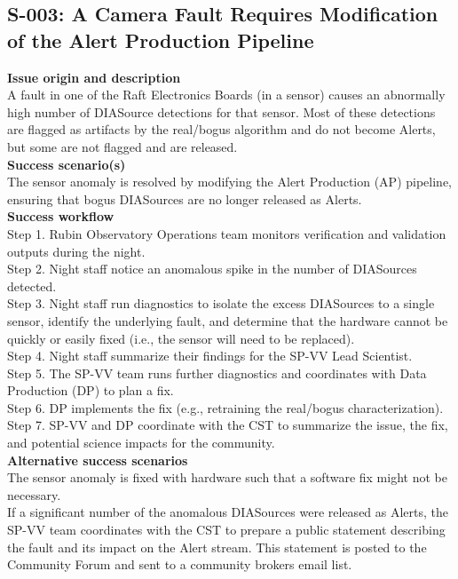 \subsection{S-003: A Camera Fault Requires Modification of the Alert Production Pipeline}

\textbf {Issue origin and description} \\
A fault in one of the Raft Electronics Boards (in a sensor) causes an abnormally high number of DIASource detections for that sensor.
Most of these detections are flagged as artifacts by the real/bogus algorithm and do not become Alerts, but some are not flagged and are released. \\

\textbf {Success scenario(s)} \\
The sensor anomaly is resolved by modifying the Alert Production (AP) pipeline, ensuring that bogus DIASources are no longer released as Alerts. \\

\textbf {Success workflow} \\
Step 1. Rubin Observatory Operations team monitors verification and validation outputs during the night.\\
Step 2. Night staff notice an anomalous spike in the number of DIASources detected.\\
Step 3. Night staff run diagnostics to isolate the excess DIASources to a single sensor, identify the underlying fault, and determine that the hardware cannot be quickly or easily fixed (i.e., the sensor will need to be replaced).\\
Step 4. Night staff summarize their findings for the SP-VV Lead Scientist.\\
Step 5. The SP-VV team runs further diagnostics and coordinates with Data Production (DP) to plan a fix.\\
Step 6. DP implements the fix (e.g., retraining the real/bogus characterization).\\
Step 7. SP-VV and DP coordinate with the CST to summarize the issue, the fix, and potential science impacts for the community.\\

\textbf {Alternative success scenarios} \\
The sensor anomaly is fixed with hardware such that a software fix might not be necessary.\\
If a significant number of the anomalous DIASources were released as Alerts, the SP-VV team coordinates with the CST to prepare a public statement describing the fault and its impact on the Alert stream.
This statement is posted to the Community Forum and sent to a community brokers email list.\\

